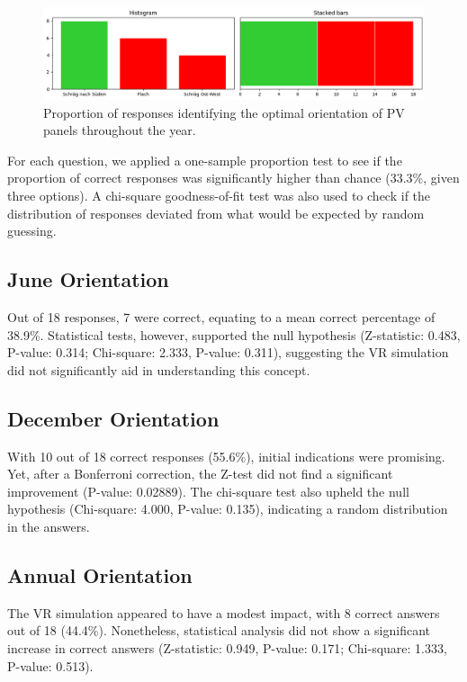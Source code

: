 \documentclass[draft, final]{vutinfth} %
\begin{document}
\begin{figure}[h]
    \centering
    \includegraphics[width=\textwidth]{graphics/test4.3.png}
    \caption[Responses for PV panel orientation throughout the year]{Proportion of responses identifying the optimal orientation of PV panels throughout the year.}
    \label{fig:annual-orientation}
\end{figure}

For each question, we applied a one-sample proportion test to see if the proportion of correct responses was significantly higher than chance (33.3\%, given three options). A chi-square goodness-of-fit test was also used to check if the distribution of responses deviated from what would be expected by random guessing.

\subsection{June Orientation}
Out of 18 responses, 7 were correct, equating to a mean correct percentage of 38.9\%. Statistical tests, however, supported the null hypothesis (Z-statistic: 0.483, P-value: 0.314; Chi-square: 2.333, P-value: 0.311), suggesting the VR simulation did not significantly aid in understanding this concept.

\subsection{December Orientation}
With 10 out of 18 correct responses (55.6\%), initial indications were promising. Yet, after a Bonferroni correction, the Z-test did not find a significant improvement (P-value: 0.02889). The chi-square test also upheld the null hypothesis (Chi-square: 4.000, P-value: 0.135), indicating a random distribution in the answers.

\subsection{Annual Orientation}
The VR simulation appeared to have a modest impact, with 8 correct answers out of 18 (44.4\%). Nonetheless, statistical analysis did not show a significant increase in correct answers (Z-statistic: 0.949, P-value: 0.171; Chi-square: 1.333, P-value: 0.513).
\end{document}
